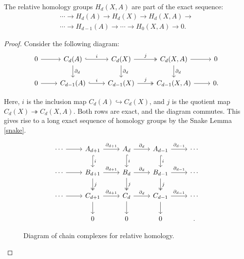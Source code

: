 \begin{theorem}
	The relative homology groups $H_{d}(X,A)$ are part of the exact sequence:
	\begin{align}
		\cdots \rightarrow H_{d}(A) \rightarrow H_{d}(X) \rightarrow H_{d}(X,A) \rightarrow \\
		\cdots \rightarrow H_{d-1}(A) \rightarrow \cdots \rightarrow H_{0}(X,A) \rightarrow 0.
	\end{align}
\end{theorem}

\begin{proof}
	Consider the following diagram:
	\begin{equation}
		\begin{tikzcd}
			0 \arrow[r] & C_d(A) \arrow[r, "i", hook] \arrow[d, "\partial_d"] & C_d(X)
			\arrow[r, "j", two heads] \arrow[d, "\partial_d"] & {C_d(X,A)} \arrow[r] \arrow[d,
			"\partial_d"] & 0 \\ 0 \arrow[r] & C_{d-1}(A) \arrow[r, "i", hook] & C_{d-1}(X)
			\arrow[r, "j", two heads] & {C_{d-1}(X,A)} \arrow[r] & 0.
		\end{tikzcd}
	\end{equation}

	Here, $i$ is the inclusion map $C_{d}(A) \hookrightarrow C_{d}(X)$, and $j$ is
	the quotient map $C_{d}(X) \twoheadrightarrow C_{d}(X,A)$. Both rows are exact,
	and the diagram commutes. This gives rise to a long exact sequence of homology
	groups by the Snake Lemma \ref{snake}.

	\begin{figure}
		\begin{equation*}
			\begin{tikzcd}
				\cdots \arrow[r] & A_{d+1} \arrow[r, "\partial_{d+1}"] \arrow[d, "i", hook]
				& A_d \arrow[r, "\partial_d"] \arrow[d, "i", hook] & A_{d-1} \arrow[r, "\partial_{d-1}"]
				\arrow[d, "i", hook] & \cdots \\ \cdots \arrow[r] & B_{d+1} \arrow[r, "\partial_{d+1}"]
				\arrow[d, "j", two heads] & B_d \arrow[r, "\partial_d"] \arrow[d, "j",
				two heads] & B_{d-1} \arrow[r, "\partial_{d-1}"] \arrow[d, "j", two
				heads] & \cdots \\ \cdots \arrow[r] & C_{d+1} \arrow[r, "\partial_{d+1}"]
				\arrow[d] & C_d \arrow[r, "\partial_d"] \arrow[d] & C_{d-1} \arrow[r, "\partial_{d-1}"]
				\arrow[d] & \cdots \\ & 0 & 0 & 0 & .
			\end{tikzcd}
		\end{equation*}
		\caption{Diagram of chain complexes for relative homology.}
		\label{diagramchains}
	\end{figure}


\end{proof}
